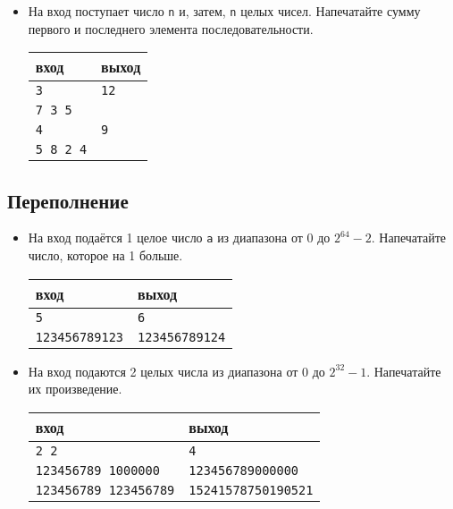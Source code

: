 \documentclass{article}
\begin{document}
\begin{itemize}
\item На вход поступает число \texttt{n} и, затем, \texttt{n} целых чисел. Напечатайте сумму первого и последнего элемента последовательности.
\begin{center}
\begin{tabular}{ l | l }
 вход & выход \\ \hline
 \texttt{3} & \texttt{12}  \\ 
 \texttt{7 3 5} &  \\ \hline
 \texttt{4} & \texttt{9}  \\ 
 \texttt{5 8 2 4} &  \\
\end{tabular}
\end{center}
\end{itemize}

\subsection*{Переполнение}
\begin{itemize}
\item На вход подаётся 1 целое число \texttt{a} из диапазона от $0$ до $2^{64} - 2$. Напечатайте число, которое на 1 больше.
\begin{center}
\begin{tabular}{ l | l }
 вход & выход \\ \hline
 \texttt{5} & \texttt{6}  \\ \hline
 \texttt{123456789123} & \texttt{123456789124}  \\ 
\end{tabular}
\end{center}
\item На вход подаются 2 целых числа из диапазона от $0$ до $2^{32} - 1$. Напечатайте их произведение.
\begin{center}
\begin{tabular}{ l | l }
 вход & выход \\ \hline
 \texttt{2 2} & \texttt{4}  \\ \hline
  \texttt{123456789 1000000} & \texttt{123456789000000}  \\ \hline
 \texttt{123456789 123456789} & \texttt{15241578750190521}  \\ 
\end{tabular}
\end{center}
\end{itemize}
\end{document}
